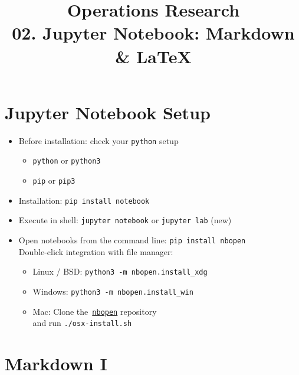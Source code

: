 \documentclass[11pt]{extarticle}
\begin{document}
\title{\texorpdfstring{\vspace{15mm} Operations Research\\ 02. Jupyter Notebook: Markdown \& \LaTeX{}}{Operations Research\\ 02. Jupyter Notebook: Markdown \& \LaTeX{}}} 
\author{}
\date{}
\maketitle
\newpage

\section*{Jupyter Notebook Setup}

\begin{itemize}
  \item Before installation: check your {\tt python} setup
    \begin{itemize}
      \item {\tt python} or {\tt python3}
      \item {\tt pip} or {\tt pip3}
    \end{itemize}
  \item Installation: {\tt pip install notebook}
  \item Execute in shell: {\tt jupyter notebook} or {\tt jupyter lab} (new)
  \item Open notebooks from the command line: {\tt pip install nbopen} \\
    Double-click integration with file manager:
    \begin{itemize}
      \item Linux / BSD: {\tt python3 -m nbopen.install\_xdg}
      \item Windows: {\tt python3 -m nbopen.install\_win}
      \item Mac: Clone the \href{https://github.com/takluyver/nbopen}{$\,${\tt nbopen}} repository \\ and run {\tt ./osx-install.sh}
    \end{itemize}
\end{itemize}

\newpage

\section*{Markdown I}
\end{document}
